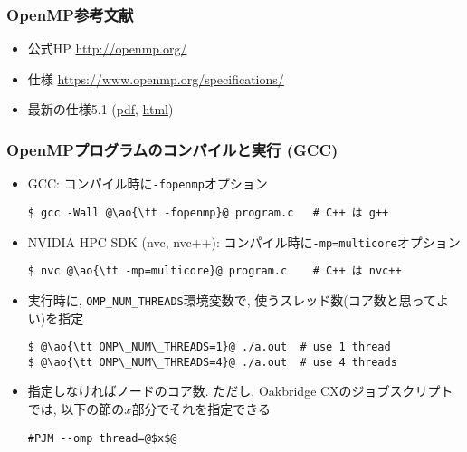 \documentclass[10pt,dvipdfmx]{beamer}
\newcommand{\ao}[1]{{\color{blue}#1}}
\begin{document}
\begin{frame}
\frametitle{OpenMP参考文献}
\begin{itemize}
\item 公式HP
  \url{http://openmp.org/}
\item 仕様
  \url{https://www.openmp.org/specifications/}
\item 最新の仕様5.1
(\href{https://www.openmp.org/wp-content/uploads/OpenMP-API-Specification-5-1.pdf}{pdf}, \href{https://www.openmp.org/spec-html/5.1/openmp.html}{html})
\end{itemize}

\end{frame}

\begin{frame}[fragile]
\frametitle{OpenMPプログラムのコンパイルと実行 (GCC)}

\begin{itemize}
\item GCC: コンパイル時に{\tt -fopenmp}オプション
\begin{lstlisting}
$ gcc -Wall @\ao{\tt -fopenmp}@ program.c   # C++ は g++
\end{lstlisting}
\item NVIDIA HPC SDK (nvc, nvc++): コンパイル時に{\tt -mp=multicore}オプション
\begin{lstlisting}
$ nvc @\ao{\tt -mp=multicore}@ program.c    # C++ は nvc++
\end{lstlisting}

\item 実行時に, {\tt OMP\_NUM\_THREADS}環境変数で,
  使うスレッド数(コア数と思ってよい)を指定
\begin{lstlisting}
$ @\ao{\tt OMP\_NUM\_THREADS=1}@ ./a.out  # use 1 thread
$ @\ao{\tt OMP\_NUM\_THREADS=4}@ ./a.out  # use 4 threads
\end{lstlisting}


\iffalse
\item 指定しなければノードのコア数.
  ただし, Reedbushのジョブスクリプトでは, 以下の節の$x$部分でそれを指定できる
\begin{lstlisting}
#PBS -l select=1:ncpus=1:mpiprocs=1:ompthreads=@$x$@
\end{lstlisting}
\fi

\item 指定しなければノードのコア数.
  ただし, Oakbridge CXのジョブスクリプトでは,
  以下の節の$x$部分でそれを指定できる
\begin{lstlisting}
#PJM --omp thread=@$x$@
\end{lstlisting} %
\end{itemize}
\end{frame}
\end{document}
